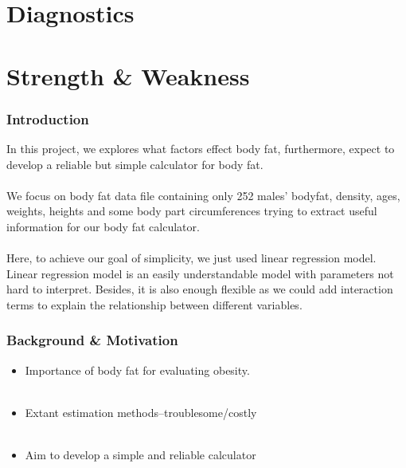 \documentclass{beamer}
\begin{document}
\section{Diagnostics}
\section{Strength \& Weakness} 

\begin{frame}
\frametitle{Introduction}
In this project, we explores what factors effect body fat, furthermore, expect to develop a reliable but simple calculator for body fat.\\~\\  We focus on body fat data file containing only 252 males' bodyfat, density, ages, weights, heights  and some body part circumferences trying to extract useful information for our body fat calculator.\\~\\  Here, to achieve our goal of simplicity, we just used linear regression model. Linear regression model is an easily understandable model with parameters not hard to interpret. Besides, it is also enough flexible as we could add interaction terms to explain the relationship between different variables.
\end{frame}



\begin{frame}
\frametitle{Background \& Motivation}
\begin{itemize}
\item Importance of body fat for evaluating obesity.\\~\\
\item Extant estimation methods--troublesome/costly\\~\\
\item Aim to develop a simple and reliable calculator
\end{itemize}
\end{frame}

\end{document}
